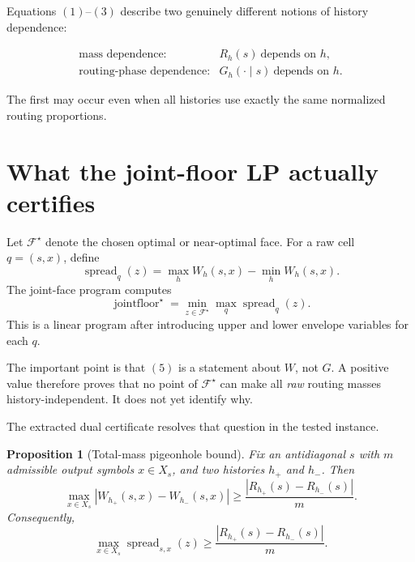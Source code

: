\documentclass[11pt,a4paper]{article}
\newcommand{\F}{\mathcal F}
\newcommand{\spread}{\operatorname{spread}}
\newcommand{\jointfloor}{\operatorname{jointfloor}}
\newtheorem{proposition}{Proposition}
\begin{document}
Equations \((1)\)--\((3)\) describe two genuinely different notions of
history dependence:

\[
\boxed{
\begin{array}{ll}
\text{mass dependence:}
&
R_h(s)\ \text{depends on }h,
\\[1mm]
\text{routing-phase dependence:}
&
G_h(\cdot\mid s)\ \text{depends on }h.
\end{array}
}
\tag{4}
\]

The first may occur even when all histories use exactly the same normalized
routing proportions.

\section{What the joint-floor LP actually certifies}

Let \(\F^\star\) denote the chosen optimal or near-optimal face.  For a raw
cell \(q=(s,x)\), define
\[
\spread_q(z)
=
\max_h W_h(s,x)-\min_h W_h(s,x).
\]
The joint-face program computes
\begin{equation}
\boxed{
\jointfloor^\star
=
\min_{z\in\F^\star}
\max_q \spread_q(z).
}
\tag{5}
\end{equation}
This is a linear program after introducing upper and lower envelope variables
for each \(q\).

The important point is that \((5)\) is a statement about \(W\), not \(G\).
A positive value therefore proves that no point of \(\F^\star\) can make all
\emph{raw} routing masses history-independent.  It does not yet identify why.

The extracted dual certificate resolves that question in the tested instance.

\begin{proposition}[Total-mass pigeonhole bound]
\label{prop:pigeonhole}
Fix an antidiagonal \(s\) with \(m\) admissible output symbols
\(x\in X_s\), and two histories \(h_+\) and \(h_-\).  Then
\begin{equation}
\boxed{
\max_{x\in X_s}
\left|
W_{h_+}(s,x)-W_{h_-}(s,x)
\right|
\ge
\frac{
\left|R_{h_+}(s)-R_{h_-}(s)\right|
}{m}.
}
\tag{6}
\end{equation}
Consequently,
\begin{equation}
\boxed{
\max_{x\in X_s}
\spread_{s,x}(z)
\ge
\frac{
\left|R_{h_+}(s)-R_{h_-}(s)\right|
}{m}.
}
\tag{7}
\end{equation}
\end{proposition}
\end{document}

